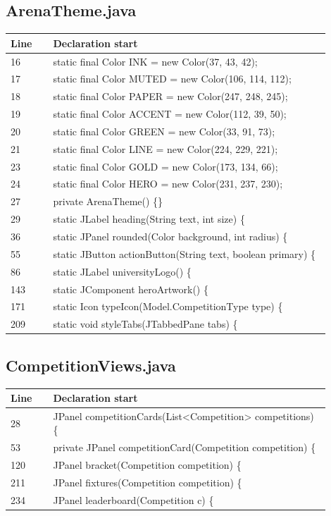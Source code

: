 \subsection*{ArenaTheme.java}
\begin{longtable}{p{0.12\linewidth}p{0.78\linewidth}}\toprule Line & Declaration start\\\midrule\endhead
16 & static final Color INK = new Color(37, 43, 42);\\
17 & static final Color MUTED = new Color(106, 114, 112);\\
18 & static final Color PAPER = new Color(247, 248, 245);\\
19 & static final Color ACCENT = new Color(112, 39, 50);\\
20 & static final Color GREEN = new Color(33, 91, 73);\\
21 & static final Color LINE = new Color(224, 229, 221);\\
23 & static final Color GOLD = new Color(173, 134, 66);\\
24 & static final Color HERO = new Color(231, 237, 230);\\
27 & private ArenaTheme() \{\}\\
29 & static JLabel heading(String text, int size) \{\\
36 & static JPanel rounded(Color background, int radius) \{\\
55 & static JButton actionButton(String text, boolean primary) \{\\
86 & static JLabel universityLogo() \{\\
143 & static JComponent heroArtwork() \{\\
171 & static Icon typeIcon(Model.CompetitionType type) \{\\
209 & static void styleTabs(JTabbedPane tabs) \{\\
\bottomrule\end{longtable}
\subsection*{CompetitionViews.java}
\begin{longtable}{p{0.12\linewidth}p{0.78\linewidth}}\toprule Line & Declaration start\\\midrule\endhead
28 & JPanel competitionCards(List<Competition> competitions) \{\\
53 & private JPanel competitionCard(Competition competition) \{\\
120 & JPanel bracket(Competition competition) \{\\
211 & JPanel fixtures(Competition competition) \{\\
234 & JPanel leaderboard(Competition c) \{\\
\bottomrule\end{longtable}
